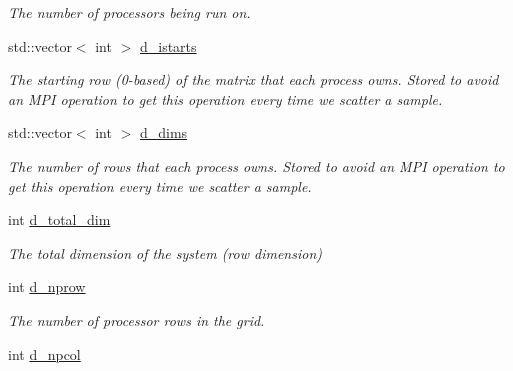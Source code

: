 \begin{DoxyCompactItemize}
\begin{DoxyCompactList}\small\item\em The number of processors being run on. \end{DoxyCompactList}\item 
\hypertarget{class_c_a_r_o_m_1_1_static_s_v_d_a681f31b3a5c8e134346865e21d33f8e0}{std\-::vector$<$ int $>$ \hyperlink{class_c_a_r_o_m_1_1_static_s_v_d_a681f31b3a5c8e134346865e21d33f8e0}{d\-\_\-istarts}}\label{class_c_a_r_o_m_1_1_static_s_v_d_a681f31b3a5c8e134346865e21d33f8e0}

\begin{DoxyCompactList}\small\item\em The starting row (0-\/based) of the matrix that each process owns. Stored to avoid an M\-P\-I operation to get this operation every time we scatter a sample. \end{DoxyCompactList}\item 
\hypertarget{class_c_a_r_o_m_1_1_static_s_v_d_aee0dd1ce7f230cec30ca51b3206f5d3d}{std\-::vector$<$ int $>$ \hyperlink{class_c_a_r_o_m_1_1_static_s_v_d_aee0dd1ce7f230cec30ca51b3206f5d3d}{d\-\_\-dims}}\label{class_c_a_r_o_m_1_1_static_s_v_d_aee0dd1ce7f230cec30ca51b3206f5d3d}

\begin{DoxyCompactList}\small\item\em The number of rows that each process owns. Stored to avoid an M\-P\-I operation to get this operation every time we scatter a sample. \end{DoxyCompactList}\item 
\hypertarget{class_c_a_r_o_m_1_1_static_s_v_d_a73e6408bd26fba550ba23a7dee558dd0}{int \hyperlink{class_c_a_r_o_m_1_1_static_s_v_d_a73e6408bd26fba550ba23a7dee558dd0}{d\-\_\-total\-\_\-dim}}\label{class_c_a_r_o_m_1_1_static_s_v_d_a73e6408bd26fba550ba23a7dee558dd0}

\begin{DoxyCompactList}\small\item\em The total dimension of the system (row dimension) \end{DoxyCompactList}\item 
\hypertarget{class_c_a_r_o_m_1_1_static_s_v_d_a1d66d0c978bdb071e57e4c90fe0fbd0c}{int \hyperlink{class_c_a_r_o_m_1_1_static_s_v_d_a1d66d0c978bdb071e57e4c90fe0fbd0c}{d\-\_\-nprow}}\label{class_c_a_r_o_m_1_1_static_s_v_d_a1d66d0c978bdb071e57e4c90fe0fbd0c}

\begin{DoxyCompactList}\small\item\em The number of processor rows in the grid. \end{DoxyCompactList}\item 
\hypertarget{class_c_a_r_o_m_1_1_static_s_v_d_a3f8e127315710034a70c05f11a58198b}{int \hyperlink{class_c_a_r_o_m_1_1_static_s_v_d_a3f8e127315710034a70c05f11a58198b}{d\-\_\-npcol}}\label{class_c_a_r_o_m_1_1_static_s_v_d_a3f8e127315710034a70c05f11a58198b}


\end{DoxyCompactItemize}
